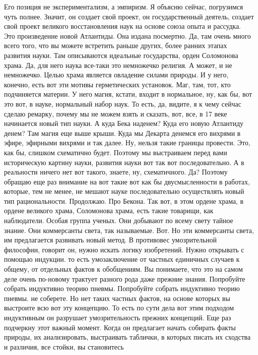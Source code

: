 Его позиция не экспериментализм, а эмпиризм. Я объясню сейчас,
погрузимся чуть полнее. Значит, он создает свой проект, он государственный
деятель, создает свой проект великого восстановления наук на основе союза опыта
и рассудка. Это произведение новой Атлантиды. Она издана посмертно. Да, там
очень много всего того, что вы можете встретить раньше других, более ранних
этапах развития науки. Там описываются идеальные государства, орден Соломонова
храма. Да, для него наука все-таки это немножечко религия. А может, и не
немножечко. Целью храма является овладение силами природы. И у него, конечно,
есть вот эти мотивы герметических установок. Маг, там, тот, кто подчиняется
материи. У него магия, кстати, входит в нормальное, ну, как бы, вот это вот, в
науке, нормальный набор наук. То есть, да, видите, я к чему сейчас сделаю
ремарку, почему мы не можем взять и сказать, вот, все, в 17 веке начинается
новый тип науки. А куда Бека наденем? Куда его новую Атлантиду денем? Там магия
еще выше крыши. Куда мы Декарта денемся его вихрями в эфире, эфирными вихрями и
так далее. Ну, нельзя такие границы провести. Это, как бы, слишком схематично
будет. Поэтому мы выстраиваем перед вами историческую картину науки, развития
науки вот так вот последовательно. А в реальности ничего нет вот такого, знаете,
ну, схематичного. Да? Поэтому обращаю еще раз внимание на вот такие вот как бы
двусмысленности в работах, которые, тем не менее, не мешают науке
последовательно осуществлять новый тип рациональности. Продолжаю. Про Бекона.
Так вот, в этом ордене храма, в ордене великого храма, Соломонова храма, есть
такие товарищи, как наблюдатели. Особая группа ученых. Они добывают по всему
свету тайное знание. Они коммерсанты света, так называемые. Вот. Но эти
коммерсанты света, им предлагается развивать новый метод. В противовес
умозрительной философии, говорит он, нужно искать логику изобретений. Нужно
открывать с помощью индукции. то есть умозаключение от частных единичных случаев
к общему, от отдельных фактов к обобщениям. Вы понимаете, что это на самом деле
очень по-новому трактует разного рода даже прежние знания. Попробуйте собрать
индуктивно теорию пневмы. Попробуйте собрать индуктивно теорию пневмы. не
соберете. Но нет таких частных фактов, на основе которых вы выстроите всю вот
эту концепцию. То есть по сути дела вот этим подходом индуктивным он разрушает
умозрительность прежних концепций. Еще раз подчеркну этот важный момент. Когда
он предлагает начать собирать факты природы, их анализировать, выстраивать
таблички, в которых писать их сходства и различия, все стойки, вы становитесь
